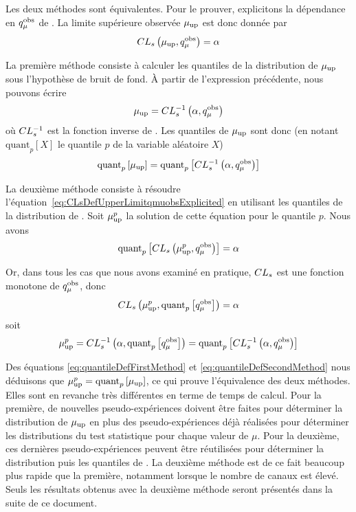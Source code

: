 Les deux m\'ethodes sont \'equivalentes.
Pour le prouver, explicitons la dépendance en $q_\mu^{\text{obs}}$ de \CLs. La limite supérieure observée $\mu_{\text{up}}$ est donc donnée par
\begin{equation}
\label{eq:CLsDefUpperLimitqmuobsExplicited}
CL_s\left(\mu_{\text{up}},q_\mu^{\text{obs}}\right)=\alpha
\end{equation}

La première méthode consiste à calculer les quantiles de la distribution de $\mu_{\text{up}}$ sous l'hypothèse de bruit de fond. \`A partir de l'expression précédente, nous pouvons écrire 
\[\mu_{\text{up}}=CL_s^{-1}\left(\alpha,q_\mu^{\text{obs}}\right)\]
où $CL_s^{-1}$ est la fonction inverse de \CLs. Les quantiles de $\mu_{\text{up}}$ sont donc (en notant $\text{quant}_p\left[X\right]$ le quantile $p$ de la variable aléatoire $X$)
\begin{equation}
\label{eq:quantileDefFirstMethod}
\text{quant}_p\left[\mu_{\text{up}}\right]=\text{quant}_p\left[CL_s^{-1}\left(\alpha,q_\mu^{\text{obs}}\right)\right]
\end{equation}

La deuxième méthode consiste à résoudre l'équation~\ref{eq:CLsDefUpperLimitqmuobsExplicited} en utilisant les quantiles de la distribution de \CLs. Soit $\mu_{\text{up}}^p$ la solution de cette équation pour le quantile $p$. Nous avons
\[\text{quant}_p\left[CL_s\left(\mu_{\text{up}}^p,q_\mu^{\text{obs}}\right)\right]=\alpha\] 

Or, dans tous les cas que nous avons examin\'e en pratique, $CL_s$ est une fonction monotone de $q_\mu^{\text{obs}}$, donc
\[CL_s\left(\mu_{\text{up}}^p,\text{quant}_p\left[q_\mu^{\text{obs}}\right]\right)=\alpha\] 
soit
\begin{equation}
\label{eq:quantileDefSecondMethod}
\mu_{\text{up}}^p=CL_s^{-1}\left(\alpha,\text{quant}_p\left[q_\mu^{\text{obs}}\right]\right)=\text{quant}_p\left[CL_s^{-1}\left(\alpha,q_\mu^{\text{obs}}\right)\right]
\end{equation}

Des équations \ref{eq:quantileDefFirstMethod} et \ref{eq:quantileDefSecondMethod} nous déduisons que $\mu_{\text{up}}^p=\text{quant}_p\left[\mu_{\text{up}}\right]$, ce qui prouve l'équivalence des deux méthodes. Elles sont en revanche tr\`es diff\'erentes en terme de temps de calcul. Pour la premi\`ere, de nouvelles pseudo-exp\'eriences doivent \^etre faites pour d\'eterminer la distribution de $\mu_{\text{up}}$ en plus des pseudo-exp\'eriences d\'ej\`a r\'ealis\'ees pour d\'eterminer les distributions du test statistique pour chaque valeur de $\mu$. Pour la deuxi\`eme, ces derni\`eres pseudo-exp\'eriences peuvent \^etre r\'eutilis\'ees pour d\'eterminer la distribution puis les quantiles de \CLs. La deuxi\`eme m\'ethode est de ce fait beaucoup plus rapide que la premi\`ere, notamment lorsque le nombre de canaux est \'elev\'e. Seuls les r\'esultats obtenus avec la deuxi\`eme m\'ethode seront pr\'esent\'es dans la suite de ce document.

